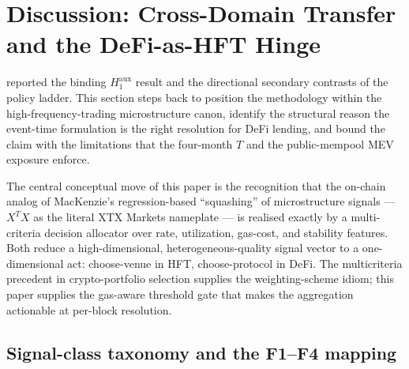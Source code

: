 \section{Discussion: Cross-Domain Transfer and the DeFi-as-HFT Hinge}
\label{sec:discussion}

 reported the binding $H_{1}^{\text{aux}}$
result and the directional secondary contrasts of the policy
ladder.  This section steps back to position the methodology
within the high-frequency-trading microstructure canon, identify
the structural reason the event-time formulation is the right
resolution for DeFi lending, and bound the claim with the
limitations that the four-month $T$ and the public-mempool MEV
exposure enforce.

The central conceptual move of this paper is the recognition that
the on-chain analog of MacKenzie's regression-based ``squashing''
of microstructure signals \cite[p.\,176]{mackenzie2021} ---
$X^{T} X$ as the literal XTX Markets nameplate --- is realised
exactly by a multi-criteria decision allocator over rate,
utilization, gas-cost, and stability features.  Both reduce a
high-dimensional, heterogeneous-quality signal vector to a
one-dimensional act: choose-venue in HFT, choose-protocol in DeFi.
The multicriteria precedent in crypto-portfolio selection
\cite{aljinovic2021} supplies the weighting-scheme idiom; this
paper supplies the gas-aware threshold gate that makes the
aggregation actionable at per-block resolution.

\subsection{Signal-class taxonomy and the F1--F4 mapping}
\label{sec:disc-signals}

